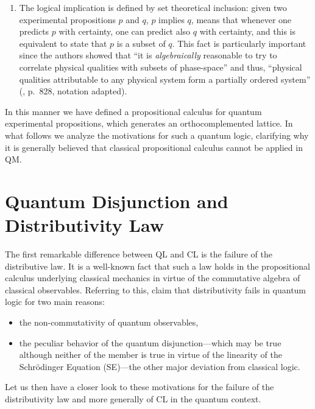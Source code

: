 \documentclass[11pt, executivepaper]{article}
\begin{document}
\begin{enumerate}
\item The logical implication is defined by set theoretical inclusion: given two experimental propositions $p$ and $q$, 
$p$ implies $q$, means that whenever one predicts $p$ with certainty, one can predict also $q$ with certainty, and this is equivalent to state that $p$ is a subset of $q$. This fact is particularly important since the authors showed that ``it is \emph{algebraically} reasonable to try to correlate physical qualities with subsets of phase-space'' and thus, ``physical qualities attributable to any physical system form a partially ordered system'' (\cite{vonNeumann:1936}, p.\ 828, notation adapted).
\end{enumerate}

In this manner we have defined a propositional calculus for quantum experimental propositions, which generates an orthocomplemented lattice. In what follows we analyze the motivations for such a quantum logic, clarifying why it is generally believed that classical propositional calculus cannot be applied in QM. 

\section{Quantum Disjunction and Distributivity Law}
\label{Motivations}

The first remarkable difference between QL and CL is the failure of the distributive law. It is a well-known fact that such a law holds in the propositional calculus underlying classical mechanics in virtue of the commutative algebra of classical observables.
Referring to this, \cite{Giuntini:2002} claim that distributivity fails in quantum logic for two main reasons:
\begin{itemize}
\item the non-commutativity of quantum observables,
\item the peculiar behavior of the quantum disjunction---which may be true although neither of the member is true in virtue of the linearity of the Schr\"odinger Equation (SE)---the other major deviation from classical logic. 
\end{itemize}
\noindent Let us then have a closer look to these motivations for the failure of the distributivity law and more generally of CL in the quantum context.
\end{document}
